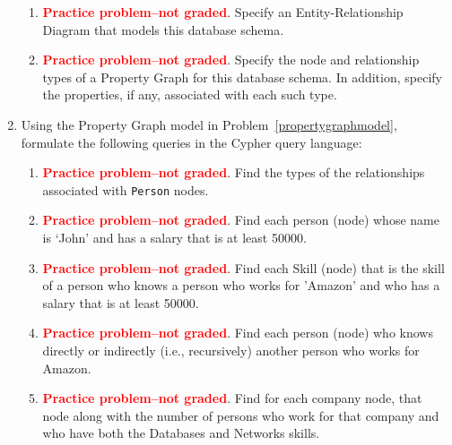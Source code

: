 \documentclass[10pt]{article}
\begin{document}
\begin{enumerate}[resume]
\begin{enumerate}
\item \textcolor{red}{\bf Practice problem--not graded}. 
\label{ER} Specify  an  Entity-Relationship  Diagram  that  models  this  database schema.




\item \textcolor{red}{\bf Practice problem--not graded}. 
\label{propertygraphmodel} Specify  the  node  and  relationship  types  of  a  Property  Graph  for this  database  schema.   In  addition,  specify  the  properties,  if  any, associated with each such type.

\end{enumerate}

\item Using the Property Graph model in Problem~\ref{propertygraphmodel},
formulate the following queries in the Cypher query language:
\begin{enumerate}
\item \textcolor{red}{\bf Practice problem--not graded}. 
Find the types of the relationships associated with {\tt Person} nodes.

\item \textcolor{red}{\bf Practice problem--not graded}. 
Find each person (node) whose name is ‘John’ and has a salary that is at least 50000.



\item \textcolor{red}{\bf Practice problem--not graded}. 
Find each Skill (node) that is the skill of a person who knows 
a person who works for 'Amazon' and who has a salary that is at least 50000.

\item \textcolor{red}{\bf Practice problem--not graded}. 
Find each person (node) who knows directly or indirectly (i.e., recursively) another person who works for Amazon.

\item \textcolor{red}{\bf Practice problem--not graded}. 
Find for each company node, that node along with the number of persons who work for that company
and who have both the Databases and Networks skills.



\end{enumerate}

\end{enumerate}
\end{document}
